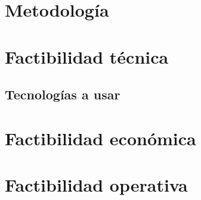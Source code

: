 \section{Metodología}
\section{Factibilidad técnica}
\subsection{Tecnologías a usar}











\section{Factibilidad económica}
\section{Factibilidad operativa}